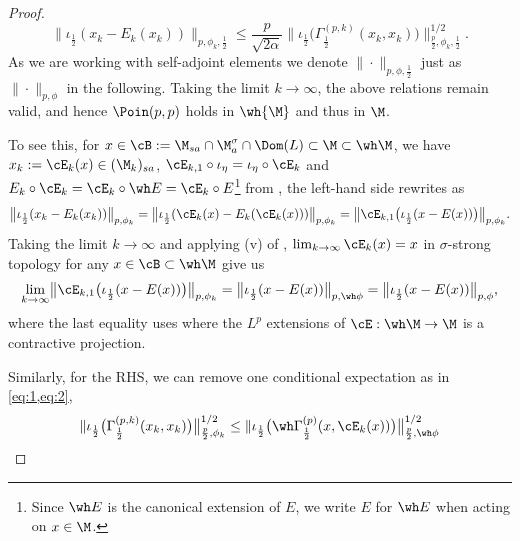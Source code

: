\documentclass[sn-mathphys-num]{sn-jnl}
\begin{document}
\begin{proof}
\[
  \bigl\|\iota_{\frac12}(x_k-E_k(x_k))\bigr\|_{p,\phi_k,\frac{1}{2}}
   \le
  \frac{p}{\sqrt{2\alpha}}
  \bigl\|\iota_{\frac12}  \bigl(\Gamma_{\frac 12}^{(p,k)}(x_k,x_k)\bigr)\bigr\|_{\frac{p}{2},\phi_k,\frac 12}^{1/2}.
\]
As we are working with self-adjoint elements we denote $\|\cdot \|_{p,\phi,\frac{1}{2}}$ just as $\|\cdot \|_{p,\phi}$ in the following.
Taking the limit $k\to\infty$, the above relations remain valid, and hence $\Poin(p,p)$ holds in $\wh{\M}$ and thus in $\M$.

To see this, for ${x}\in\cB:={\M}_{sa}\cap{\M}^\sigma_a\cap \Dom( L)\subset \M \subset \wh \M$, we have $x_k:=\cE_k({x})\in(\M_k)_{sa}$, $\cE_{k,1}\circ\iota_\eta=\iota_\eta\circ\cE_k$ and $E_k\circ\cE_k=\cE_k\circ \wh E=\cE_k\circ E$\footnote{Since $\wh E$ is the canonical extension of $E$, we write $E$ for $\wh E$ when acting on $x\in\M$.} from
, the left-hand side rewrites as
\begin{equation}\label{eq:1}
     \bigl\|\iota_{\frac12}(x_k-E_k(x_k))\bigr\|_{p,\phi_k}=\bigl\|\iota_{\frac12}(\cE_k(x)-E_k(\cE_k(x)))\bigr\|_{p,\phi_k}=\bigl\|\cE_{k,1}\bigl(\iota_{\frac12}(x- E(x))\bigr)\bigr\|_{p,\phi_k}.
\end{equation}
Taking the limit $k\to \infty$ and applying (v) of , $\lim_{k\to\infty}\cE_k(x)=x$ in $\sigma$-strong topology for any $x\in\cB\subset\wh\M$ give us
\begin{equation}\label{eq:2} \lim_{k\to\infty}\bigl\|\cE_{k,1}\bigl(\iota_{\frac12}(x- E(x))\bigr)\bigr\|_{p,\phi_k}=\bigl\|\iota_{\frac12}(x- E(x))\bigr\|_{p,\wh \phi}=\bigl\|\iota_{\frac12}(x- E(x))\bigr\|_{p,\phi},
\end{equation}
where the last equality uses  where the $L^p$ extensions of $\cE:\wh\M\to\M$ is a contractive projection.



Similarly, for the RHS, we can remove one conditional expectation as in \cref{eq:1,eq:2},
\[ \|\iota_{\frac{1}{2}}\bigl(\Gamma_{\frac 12}^{(p,k)}(x_k,x_k)\bigr)\bigr\|_{\frac{p}{2},\phi_k }^{1/2}\le\|\iota_{\frac{1}{2}}\bigl(\wh\Gamma_{\frac 12}^{(p)}(x,\cE_k(x))\bigr)\bigr\|_{\frac{p}{2},\wh \phi }^{1/2}\]


\end{proof}
\end{document}
